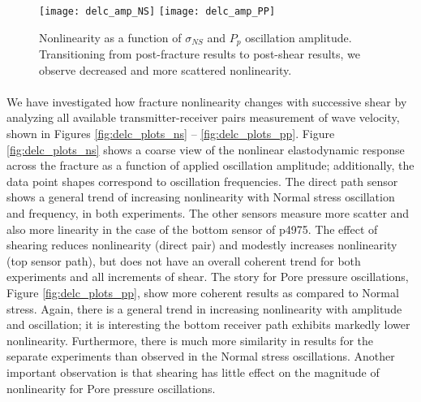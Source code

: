 \clearpage

\begin{figure*}[ht]
	\centering
	\texttt{[image: delc\_amp\_NS]}
	\texttt{[image: delc\_amp\_PP]}
	\caption{Nonlinearity as a function of $ \sigma_{NS} $ and $ P_p $ oscillation amplitude. Transitioning from post-fracture results to post-shear results, we observe decreased and more scattered nonlinearity.}%
	\label{fig:delc_ns_amp}
\end{figure*}

\clearpage


\paragraph{}
We have investigated how fracture nonlinearity changes with successive shear by analyzing all available transmitter-receiver pairs measurement of wave velocity, shown in Figures \ref{fig:delc_plots_ns} -- \ref{fig:delc_plots_pp}. Figure \ref{fig:delc_plots_ns} shows a coarse view of the nonlinear elastodynamic response across the fracture as a function of applied oscillation amplitude; additionally, the data point shapes correspond to oscillation frequencies. The direct path sensor shows a general trend of increasing nonlinearity with Normal stress oscillation and frequency, in both experiments. The other sensors measure more scatter and also more linearity in the case of the bottom sensor of p4975. The effect of shearing reduces nonlinearity (direct pair) and modestly increases nonlinearity (top sensor path), but does not have an overall coherent trend for both experiments and all increments of shear. 
The story for Pore pressure oscillations, Figure \ref{fig:delc_plots_pp}, show more coherent results as compared to Normal stress. Again, there is a general trend in increasing nonlinearity with amplitude and oscillation; it is interesting the bottom receiver path exhibits markedly lower nonlinearity. Furthermore, there is much more similarity in results for the separate experiments than observed in the Normal stress oscillations. Another important observation is that shearing has little effect on the magnitude of nonlinearity for Pore pressure oscillations. 

